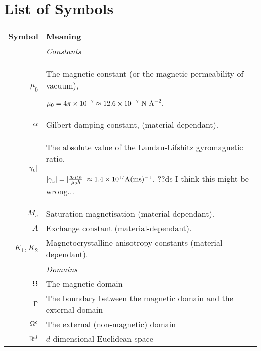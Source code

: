 

\section*{List of Symbols}

\renewcommand{\arraystretch}{1.2}

\newcommand{\hlinegap}[1]{\noalign{\medskip} & \emph{#1} \\ \hline \noalign{\smallskip}}

\begin{tabular}{r  p{12cm}} %

  \textbf{Symbol} & \textbf{Meaning} \\
  \hline\hline %

  \hlinegap{Constants}
  $\mu_0$ & The magnetic constant (or the magnetic permeability of vacuum),

  $\mu_0 = 4 \pi \times 10^{-7} \approx 12.6 \times 10^{-7} \text{ N A}^{-2}.$ \\
  $\alpha$ & Gilbert damping constant, (material-dependant). \\
  ${\lvert \gamma_{\text{\tiny{L}}} \rvert}$ & The absolute value of the Landau-Lifshitz gyromagnetic ratio,

  ${\lvert \gamma_{\text{\tiny{L}}} \rvert} = \lvert  \frac{g_e \mu_B}{\mu_0 \hbar}  \rvert \approx 1.4 \times 10^{17} {\text{A}(\text{ms})^{-1}}$. ??ds I think this might be wrong... \\

  $M_s$ & Saturation magnetisation (material-dependant). \\
  $A$ & Exchange constant (material-dependant). \\
  $K_1, K_2$ & Magnetocrystalline anisotropy constants (material-dependant). \\

  \hlinegap{Domains}
  $\Omega$ & The magnetic domain \\
  ${\Gamma}$ & The boundary between the magnetic domain and the external domain \\
  ${\Omega^c}$ & The external (non-magnetic) domain \\
  $\mathbb{R}^d$ & $d$-dimensional Euclidean space \\


\end{tabular}

